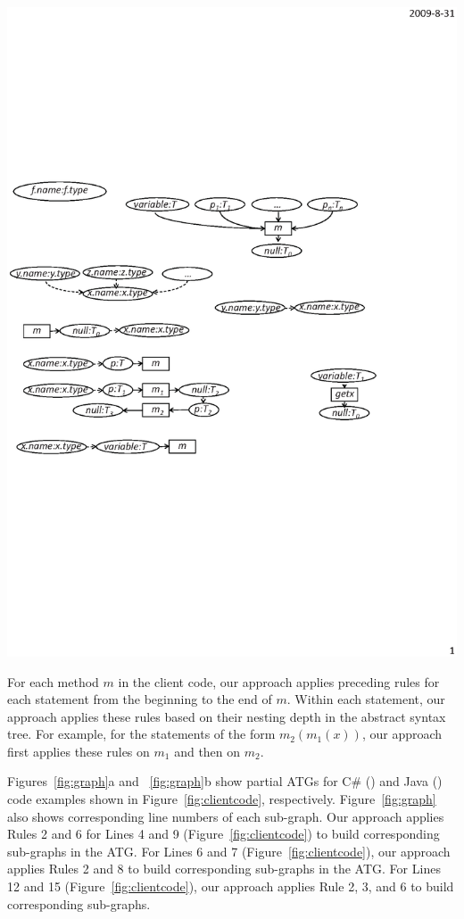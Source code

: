 \begin{enumerate}
\begin{center}
\includegraphics[scale=0.7,clip]{figure/rule9.eps}%
\end{center}\vspace*{-2ex}
\end{enumerate}

For each method $m$ in the client code, our approach applies preceding
rules for each statement from the beginning to the end of $m$.
Within each statement, our approach applies these rules based on
their nesting depth in the abstract syntax tree. For example,
for the statements of the form $m_2(m_1(x))$, our approach first applies
these rules on $m_1$ and then on $m_2$.

Figures~\ref{fig:graph}a and ~\ref{fig:graph}b show partial ATGs for
C\# () and Java ()
code examples shown in Figure~\ref{fig:clientcode}, respectively.
Figure~\ref{fig:graph} also shows corresponding line numbers of each
sub-graph. Our approach applies Rules 2 and 6 for Lines 4 and 9 (Figure~\ref{fig:clientcode})
to build corresponding sub-graphs in the ATG. For
Lines 6 and 7 (Figure~\ref{fig:clientcode}), our approach applies Rules 2 and 8 to build
corresponding sub-graphs in the ATG. For Lines 12 and 15 (Figure~\ref{fig:clientcode}),
our approach applies Rule 2, 3, and 6 to build corresponding sub-graphs.

